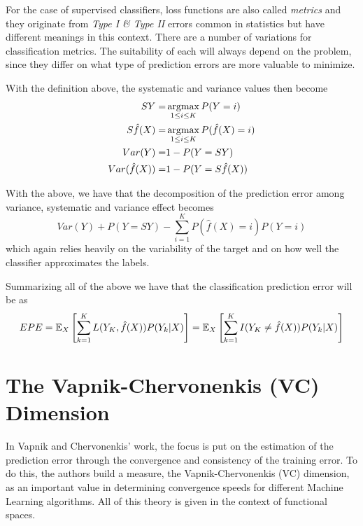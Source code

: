 \begin{appendices}
For the case of supervised classifiers, loss functions are also called \textit{metrics} and they originate from \textit{Type I \& Type II} errors common in statistics but have different meanings in this context.
There are a number of variations for classification metrics.
The suitability of each will always depend on the problem, since they differ on what type of prediction errors are more valuable to minimize.

With the definition above, the systematic and variance values then become
\begin{equation}
	\begin{split}
	SY = & \operatorname*{argmax}_{1\leq i \leq K} P(Y=i) \\
	S\hat{f}(X) = &\operatorname*{argmax}_{1\leq i \leq K} P(\hat{f}(X)=i) \\
	Var(Y) = &1 - P(Y=SY) \\
	Var(\hat{f}(X)) =& 1 - P(Y = S\hat{f}(X)) \\
	\end{split}
\end{equation}


With the above, we have that the decomposition of the prediction error among variance, systematic and variance effect becomes
\begin{equation}
Var(Y) + P(Y=SY) - \sum_{i=1}^K P(\hat{f}(X) =i)P(Y=i)
\end{equation}
	 which again relies heavily on the variability of the target and on how well the classifier approximates the labels.


Summarizing all of the above we have that the classification prediction error will be as
\begin{equation}
EPE = \operatorname{\mathbb{E}}_X\left[ \sum_{k=1}^{K} L( Y_K , \hat{f}(X) ) P(Y_k|X) \right] =
\operatorname{\mathbb{E}}_X\left[ \sum_{k=1}^{K} I(Y _K\neq \hat{f}(X)) P(Y_k|X) \right]
\end{equation}\label{eq:classificationEPE}


\section{The Vapnik-Chervonenkis (VC) Dimension }\label{appx:sec:vcDimension}

In Vapnik and Chervonenkis' work, the focus is put on the estimation of the prediction error through the convergence and consistency of the training error.
To do this, the authors build a measure, the Vapnik-Chervonenkis (VC) dimension, as an important value in determining convergence speeds for different Machine Learning algorithms.
All of this theory is given in the context of functional spaces.


\end{appendices}
